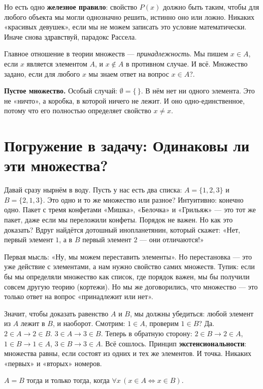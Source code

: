 Но есть одно \textbf{железное правило}: свойство $P(x)$ должно быть таким, чтобы для любого объекта мы могли однозначно решить, истинно оно или ложно. Никаких «красивых девушек», если мы не можем записать это условие математически. Иначе снова здравствуй, парадокс Рассела.

Главное отношение в теории множеств — \emph{принадлежность}. Мы пишем $x \in A$, если $x$ является элементом $A$, и $x \notin A$ в противном случае. И всё. Множество задано, если для любого $x$ мы знаем ответ на вопрос $x \in A$?.

\smallskip
\textbf{Пустое множество.} Особый случай: $\emptyset = \{\,\}$. В нём нет ни одного элемента. Это не «ничто», а коробка, в которой ничего не лежит. И оно одно-единственное, потому что его полностью определяет свойство $x \neq x$.

\section{Погружение в задачу: Одинаковы ли эти множества?}
\label{sec:same-sets}

Давай сразу нырнём в воду. Пусть у нас есть два списка: $A = \{1, 2, 3\}$ и $B = \{2, 1, 3\}$. Это одно и то же множество или разное? Интуитивно: конечно одно. Пакет с тремя конфетами «Мишка», «Белочка» и «Грильяж» — это тот же пакет, даже если мы переложили конфеты. Порядок не важен. Но как это доказать? Вдруг найдётся дотошный инопланетянин, который скажет: «Нет, первый элемент $1$, а в $B$ первый элемент $2$ — они отличаются!»

Первая мысль: «Ну, мы можем переставить элементы». Но перестановка — это уже действие с элементами, а нам нужно свойство самих множеств. Тупик: если бы мы определяли множество как список, где порядок важен, мы бы получили совсем другую теорию (кортежи). Но мы же договорились, что множество — это только ответ на вопрос «принадлежит или нет».

Значит, чтобы доказать равенство $A$ и $B$, мы должны убедиться: любой элемент из $A$ лежит в $B$, и наоборот. Смотрим: $1 \in A$, проверим $1 \in B$? Да. $2 \in A \to 2 \in B$. $3 \in A \to 3 \in B$. Теперь в обратную сторону: $2 \in B \to 2 \in A$, $1 \in B \to 1 \in A$, $3 \in B \to 3 \in A$. Всё сошлось. Принцип \textbf{экстенсиональности}: множества равны, если состоят из одних и тех же элементов. И точка. Никаких «первых» и «вторых» номеров.

\begin{axiom}[Экстенсиональность]
  $A = B$ тогда и только тогда, когда $\forall x \,(x \in A \iff x \in B)$.
\end{axiom}

